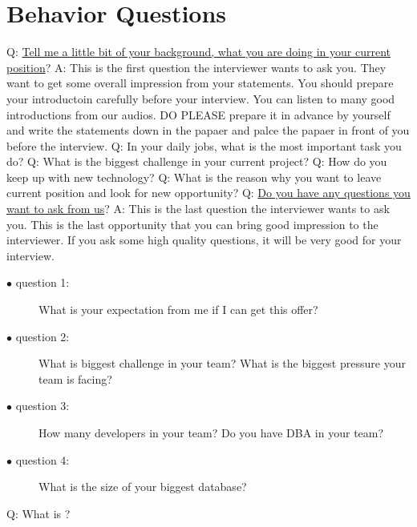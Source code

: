 \documentclass[a4paper,11pt]{article}
\begin{document}
\section{Behavior Questions}
Q: \ul{Tell me a little bit of your background, what you are doing in your current position}? \newline
A: This is the first question the interviewer wants to ask you. They want to get some overall impression from your statements. You should prepare your introductoin carefully before your interview. You can listen to many good introductions from our audios. DO PLEASE prepare it in advance by yourself and write the statements down in the papaer and palce the papaer in front of you before the interview.\newline \newline
\noindent 
Q: In your daily jobs, what is the most important task you do? \newline \newline
\noindent 
Q: What is the biggest challenge in your current project? \newline \newline
\noindent 
Q: How do you keep up with new technology? \newline \newline
\noindent 
Q: What is the reason why you want to leave current position and look for new opportunity? \newline \newline
\noindent 
Q: \ul{Do you have any questions you want to ask from us}?\newline
A: This is the last question the interviewer wants to ask you. This is the last opportunity that you can bring good impression to the interviewer. If you ask some high quality questions, it will be very good for your interview.
\begin{description}
  \item[$\bullet$ question 1:] What is your expectation from me if I can get this offer?
  \item[$\bullet$ question 2:] What is biggest challenge in your team? What is the biggest pressure your team is facing?
  \item[$\bullet$ question 3:] How many developers in your team? Do you have DBA in your team?
  \item[$\bullet$ question 4:] What is the size of your biggest database?
\end{description}

\noindent 
Q: What is ? \newline \newline
\end{document}
